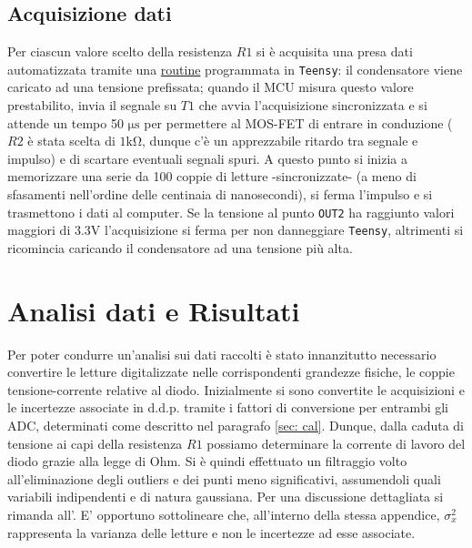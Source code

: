 \documentclass{article}[a4paper, oneside, 11pt]
\begin{document}
\subsection{Acquisizione dati}
Per ciascun valore scelto della resistenza $R1$ si \`e acquisita una presa 
dati automatizzata tramite una 
\href{https://github.com/LucaCiucci/relaz_seme/blob/master/sketches/teensy_differenziale_definitivo/teensy_differenziale_definitivo.ino}
{routine} programmata in \verb+Teensy+: il condensatore viene caricato ad una
tensione prefissata; quando il MCU misura questo valore prestabilito,
invia il segnale su $T1$ che avvia l'acquisizione sincronizzata e si attende
un tempo 50 $\si{\us}$ per permettere al MOS-FET di entrare in conduzione
($R2$ \`e stata scelta di $1 \si{\kohm}$, dunque c'\`e un apprezzabile ritardo
tra segnale e impulso) e di scartare eventuali segnali spuri.
A questo punto si inizia a memorizzare una serie da 100 coppie di letture
-sincronizzate- (a meno di sfasamenti nell'ordine delle centinaia di
nanosecondi), si ferma l'impulso e si trasmettono i dati al computer.
Se la tensione al punto \verb+OUT2+ ha raggiunto valori maggiori di $3.3\si{\V}$
l'acquisizione si ferma per non danneggiare \verb+Teensy+, altrimenti si
ricomincia caricando il condensatore ad una tensione pi\`u alta.

\section{Analisi dati e Risultati}
Per poter condurre un'analisi sui dati raccolti \`e stato innanzitutto
necessario convertire le letture digitalizzate nelle corrispondenti
grandezze fisiche, le coppie tensione-corrente relative al diodo.
Inizialmente si sono convertite le acquisizioni e le incertezze associate in
d.d.p. tramite i fattori di conversione per entrambi gli ADC,
determinati come descritto nel paragrafo \ref{sec: cal}.
Dunque, dalla caduta di tensione ai capi della resistenza $R1$ possiamo
determinare la corrente di lavoro del diodo grazie alla legge di Ohm. 
Si \`e quindi effettuato un filtraggio volto all'eliminazione degli outliers e 
dei punti meno significativi, assumendoli quali variabili indipendenti e di 
natura gaussiana. Per una discussione dettagliata si rimanda all'. E’ opportuno sottolineare che, all’interno della stessa appendice, 
$\sigma_x^2$ rappresenta la varianza delle letture e non le incertezze ad esse
associate.
\end{document}
